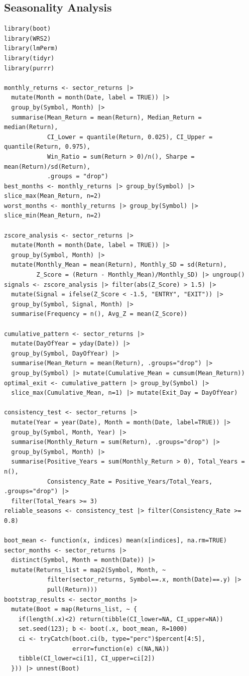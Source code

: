 \documentclass[12pt,a4paper,fleqn]{article}
\begin{document}
\subsection*{Seasonality Analysis}
\begin{tcolorbox}[colback=gray!5, colframe=black!70, fontupper=\small, breakable, title=R Code]
\begin{verbatim}
library(boot)
library(WRS2)
library(lmPerm)
library(tidyr)
library(purrr)

monthly_returns <- sector_returns |>
  mutate(Month = month(Date, label = TRUE)) |>
  group_by(Symbol, Month) |>
  summarise(Mean_Return = mean(Return), Median_Return = median(Return),
            CI_Lower = quantile(Return, 0.025), CI_Upper = quantile(Return, 0.975),
            Win_Ratio = sum(Return > 0)/n(), Sharpe = mean(Return)/sd(Return),
            .groups = "drop")
best_months <- monthly_returns |> group_by(Symbol) |> slice_max(Mean_Return, n=2)
worst_months <- monthly_returns |> group_by(Symbol) |> slice_min(Mean_Return, n=2)

zscore_analysis <- sector_returns |>
  mutate(Month = month(Date, label = TRUE)) |>
  group_by(Symbol, Month) |>
  mutate(Monthly_Mean = mean(Return), Monthly_SD = sd(Return),
         Z_Score = (Return - Monthly_Mean)/Monthly_SD) |> ungroup()
signals <- zscore_analysis |> filter(abs(Z_Score) > 1.5) |>
  mutate(Signal = ifelse(Z_Score < -1.5, "ENTRY", "EXIT")) |>
  group_by(Symbol, Signal, Month) |>
  summarise(Frequency = n(), Avg_Z = mean(Z_Score))

cumulative_pattern <- sector_returns |>
  mutate(DayOfYear = yday(Date)) |>
  group_by(Symbol, DayOfYear) |> 
  summarise(Mean_Return = mean(Return), .groups="drop") |>
  group_by(Symbol) |> mutate(Cumulative_Mean = cumsum(Mean_Return))
optimal_exit <- cumulative_pattern |> group_by(Symbol) |>
  slice_max(Cumulative_Mean, n=1) |> mutate(Exit_Day = DayOfYear)

consistency_test <- sector_returns |>
  mutate(Year = year(Date), Month = month(Date, label=TRUE)) |>
  group_by(Symbol, Month, Year) |>
  summarise(Monthly_Return = sum(Return), .groups="drop") |>
  group_by(Symbol, Month) |>
  summarise(Positive_Years = sum(Monthly_Return > 0), Total_Years = n(),
            Consistency_Rate = Positive_Years/Total_Years, .groups="drop") |>
  filter(Total_Years >= 3)
reliable_seasons <- consistency_test |> filter(Consistency_Rate >= 0.8)

boot_mean <- function(x, indices) mean(x[indices], na.rm=TRUE)
sector_months <- sector_returns |>
  distinct(Symbol, Month = month(Date)) |>
  mutate(Returns_list = map2(Symbol, Month, ~ 
            filter(sector_returns, Symbol==.x, month(Date)==.y) |>
            pull(Return)))
bootstrap_results <- sector_months |>
  mutate(Boot = map(Returns_list, ~ {
    if(length(.x)<2) return(tibble(CI_lower=NA, CI_upper=NA))
    set.seed(123); b <- boot(.x, boot_mean, R=1000)
    ci <- tryCatch(boot.ci(b, type="perc")$percent[4:5], 
                   error=function(e) c(NA,NA))
    tibble(CI_lower=ci[1], CI_upper=ci[2])
  })) |> unnest(Boot)


\end{verbatim}
\end{tcolorbox}
\end{document}

